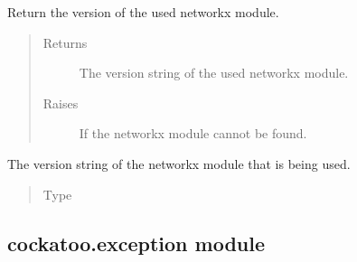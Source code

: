 \documentclass[letterpaper,10pt,english]{sphinxmanual}
\begin{document}
\begin{fulllineitems}
\label{\detokenize{cockatoo:cockatoo.environment.networkx_version}}
Return the version of the used networkx module.
\begin{quote}\begin{description}
\item[{Returns}] \leavevmode
{} \textendash{} The version string of the used networkx module.

\item[{Raises}] \leavevmode
{\hyperref[\detokenize{cockatoo:cockatoo.exception.NetworkXNotPresentError}]{}} \textendash{} If the networkx module cannot be found.

\end{description}\end{quote}

\end{fulllineitems}


\begin{fulllineitems}
\label{\detokenize{cockatoo:cockatoo.environment.NXVERSION}}
The version string of the networkx module that is being used.
\begin{quote}\begin{description}
\item[{Type}] \leavevmode
{}%
\begin{footnote}[48]\sphinxAtStartFootnote
{}
%
\end{footnote}

\end{description}\end{quote}

\end{fulllineitems}



\subsection{cockatoo.exception module}
\label{\detokenize{cockatoo:module-cockatoo.exception}}\label{\detokenize{cockatoo:cockatoo-exception-module}}
\end{document}
